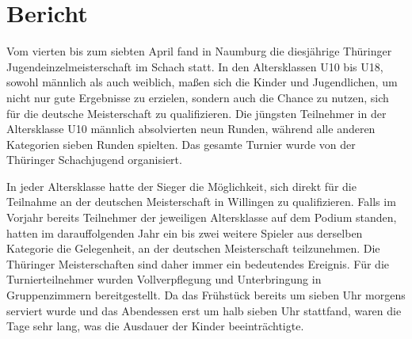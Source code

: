 \documentclass[a4paper,ngerman]{tui-algo-seminar}
\title{\inhalt}
\author{Erik Skopp}
\newcommand{\inhalt}{Thüringer Jugend Einzelmeisterschaft 2024}
\begin{document}
\maketitle
\thispagestyle{plain}
\begin{abstract}
    Bericht: \inhalt.\\
    Vom 4. bis zum 7. April fand in Naumburg (Sachsen-Anhalt) die diesjährige Thüringer Jugend-Einzelmeisterschaft im Schach statt. In jeder Altersklasse wurden sieben Runden nach dem Schweizer System ausgetragen. Die Gewinner qualifizieren sich für die Deutsche Einzelmeisterschaft in Willingen.
\end{abstract}

\tableofcontents 

\clearpage

\section{Bericht}

Vom vierten bis zum siebten April fand in Naumburg die diesjährige Thüringer Jugendeinzelmeisterschaft im Schach statt. In den Altersklassen U10 bis U18, sowohl männlich als auch weiblich, maßen sich die Kinder und Jugendlichen, um nicht nur gute Ergebnisse zu erzielen, sondern auch die Chance zu nutzen, sich für die deutsche Meisterschaft zu qualifizieren. Die jüngsten Teilnehmer in der Altersklasse U10 männlich absolvierten neun Runden, während alle anderen Kategorien sieben Runden spielten. Das gesamte Turnier wurde von der Thüringer Schachjugend organisiert.

In jeder Altersklasse hatte der Sieger die Möglichkeit, sich direkt für die Teilnahme an der deutschen Meisterschaft in Willingen zu qualifizieren. Falls im Vorjahr bereits Teilnehmer der jeweiligen Altersklasse auf dem Podium standen, hatten im darauffolgenden Jahr ein bis zwei weitere Spieler aus derselben Kategorie die Gelegenheit, an der deutschen Meisterschaft teilzunehmen. Die Thüringer Meisterschaften sind daher immer ein bedeutendes Ereignis. Für die Turnierteilnehmer wurden Vollverpflegung und Unterbringung in Gruppenzimmern bereitgestellt. Da das Frühstück bereits um sieben Uhr morgens serviert wurde und das Abendessen erst um halb sieben Uhr stattfand, waren die Tage sehr lang, was die Ausdauer der Kinder beeinträchtigte.
\end{document}
